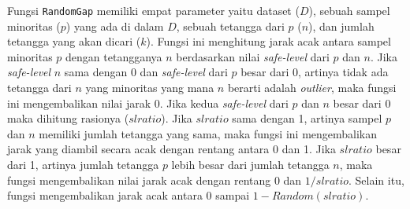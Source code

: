 Fungsi \texttt{RandomGap} memiliki empat parameter yaitu dataset ($D$), sebuah
sampel minoritas ($p$) yang ada di dalam $D$, sebuah tetangga dari $p$ ($n$),
dan jumlah tetangga yang akan dicari ($k$).
Fungsi ini menghitung jarak acak antara sampel minoritas $p$ dengan tetangganya
$n$ berdasarkan nilai \textit{safe-level} dari $p$ dan $n$.
Jika \textit{safe-level} $n$ sama dengan 0 dan \textit{safe-level} dari $p$
besar dari 0, artinya tidak ada tetangga dari $n$ yang minoritas yang mana $n$
berarti adalah \textit{outlier}, maka fungsi ini mengembalikan nilai jarak 0.
Jika kedua \textit{safe-level} dari $p$ dan $n$ besar dari 0 maka dihitung
rasionya ($slratio$).
Jika $slratio$ sama dengan 1, artinya sampel $p$ dan $n$ memiliki jumlah
tetangga yang sama, maka fungsi ini mengembalikan jarak yang diambil secara
acak dengan rentang antara 0 dan 1.
Jika $slratio$ besar dari 1, artinya jumlah tetangga $p$ lebih besar dari
jumlah tetangga $n$, maka fungsi mengembalikan nilai jarak acak dengan rentang
0 dan $1/slratio$.
Selain itu, fungsi mengembalikan jarak acak antara 0 sampai
$1-Random(slratio)$.
